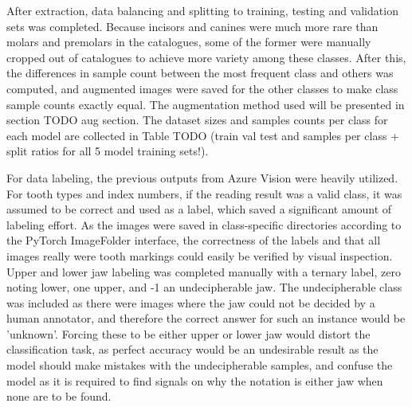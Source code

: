 \documentclass{article}
\begin{document}
After extraction, data balancing and splitting to training, testing and validation sets 
was completed.
Because incisors and canines were much more rare 
than molars and premolars in the catalogues, some of the former were manually cropped out 
of catalogues to achieve more variety among these classes. After this, the differences 
in sample count between the most frequent class and others was computed, and augmented 
images were saved for the other classes to make class sample counts exactly equal. The augmentation 
method used will be presented in section TODO aug section. The dataset sizes and samples counts per class 
for each model are collected in Table TODO (train val test and samples per class + split ratios for all 5 model training sets!).

For data labeling, the previous outputs from Azure Vision were heavily utilized. For 
tooth types and index numbers, if the reading result was a valid class, it was assumed to 
be correct and used as a label, which saved a significant amount of labeling effort. As the 
images were saved in class-specific directories according to the PyTorch ImageFolder interface,
the correctness of the labels and that all images really were tooth markings could easily be verified by visual inspection. Upper and lower jaw labeling 
was completed manually with a ternary label, zero noting lower, one upper, and -1 an undecipherable jaw.
The undecipherable class was included as there were images where the jaw could not be decided by a human annotator, 
and therefore the correct answer for such an instance would be 'unknown'. Forcing these to be either upper or lower jaw 
would distort the classification task, as perfect accuracy would be an undesirable result as the model should 
make mistakes with the undecipherable samples, and confuse the model as it is required to find signals on why 
the notation is either jaw when none are to be found.
\end{document}
